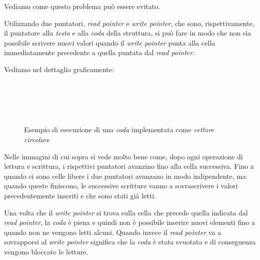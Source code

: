 \bigskip\noindent Vediamo come questo problema può essere evitato.

Utilizzando due puntatori, \emph{read pointer} e \emph{write pointer}, che sono,
rispettivamente, il puntatore alla \emph{testa} e alla \emph{coda} della struttura,
si può fare in modo che non sia possibile scrivere nuovi valori quando il
\emph{write pointer} punta alla cella immediatamente precedente a quella puntata
dal \emph{read pointer}.

\bigskip\noindent Vediamo nel dettaglio graficamente:
\begin{figure}[h]
    \centering
    \\
    \\
\end{figure}\newpage
\begin{figure}[ht]\ContinuedFloat
    \centering
    \\
    \caption{Esempio di esecuzione di una \emph{coda} implementata come \emph{vettore circolare}}
\end{figure}\noindent
Nelle immagini di cui sopra si vede molto bene come, dopo ogni operazione di lettura
e scrittura, i rispettivi puntatori avanzino fino alla cella successiva.
Fino a quando ci sono celle libere i due puntatori avanzano in modo indipendente,
ma quando queste finiscono, le successive scritture vanno a sovrascrivere i
valori precedentemente inseriti e che sono stati già letti.

Una volta che il \emph{write pointer} si trova sulla cella che precede quella
indicata dal \emph{read pointer}, la \emph{coda} è piena e quindi non è possibile
inserire nuovi elementi fino a quando non ne vengono letti alcuni. Quando invece
il \emph{read pointer} va a sovrapporsi al \emph{write pointer} significa che la
\emph{coda} è stata svuotata e di conseguenza vengono bloccate le letture.

